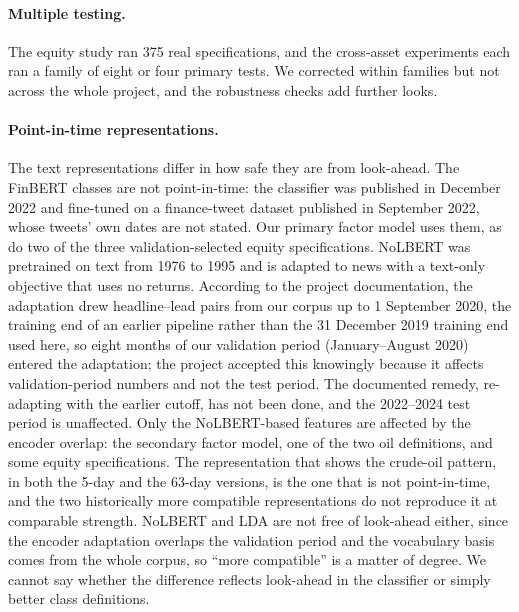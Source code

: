 \documentclass[11pt]{article}
\begin{document}
\paragraph{Multiple testing.} The equity study ran 375 real specifications, and the cross-asset experiments each ran a family of eight or four primary tests. We corrected within families but not across the whole project, and the robustness checks add further looks.

\paragraph{Point-in-time representations.} The text representations differ in how safe they are from look-ahead. The FinBERT classes are not point-in-time: the classifier was published in December 2022 and fine-tuned on a finance-tweet dataset published in September 2022, whose tweets' own dates are not stated. Our primary factor model uses them, as do two of the three validation-selected equity specifications. NoLBERT was pretrained on text from 1976 to 1995 and is adapted to news with a text-only objective that uses no returns. According to the project documentation, the adaptation drew headline--lead pairs from our corpus up to 1 September 2020, the training end of an earlier pipeline rather than the 31 December 2019 training end used here, so eight months of our validation period (January--August 2020) entered the adaptation; the project accepted this knowingly because it affects validation-period numbers and not the test period. The documented remedy, re-adapting with the earlier cutoff, has not been done, and the 2022--2024 test period is unaffected. Only the NoLBERT-based features are affected by the encoder overlap: the secondary factor model, one of the two oil definitions, and some equity specifications. The representation that shows the crude-oil pattern, in both the 5-day and the 63-day versions, is the one that is not point-in-time, and the two historically more compatible representations do not reproduce it at comparable strength. NoLBERT and LDA are not free of look-ahead either, since the encoder adaptation overlaps the validation period and the vocabulary basis comes from the whole corpus, so ``more compatible'' is a matter of degree. We cannot say whether the difference reflects look-ahead in the classifier or simply better class definitions.
\end{document}
